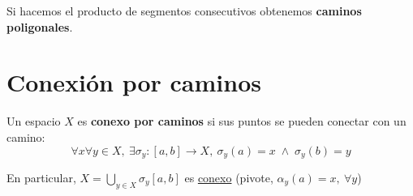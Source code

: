 \begin{ej}
Si hacemos el producto de segmentos consecutivos obtenemos \textbf{caminos poligonales}. 
\end{ej}

\section{Conexión por caminos}%
\label{sec:conexion_por_caminos}
\begin{defi}
Un espacio $X$ es \textbf{conexo por caminos} si sus puntos se pueden conectar con un camino:
\[
\forall x \forall y \in X,\ \exists \sigma_y: \left[ a, b \right] \rightarrow X,\ \sigma_y\left( a \right) = x\; \land \;\sigma_y\left( b \right) = y
\]
\end{defi}
\begin{obs}
En particular, $X = \bigcup_{y \in X} \sigma_y\left[ a, b \right]$ es \underline{conexo} (pivote, $\alpha_y\left( a \right) = x,\ \forall y$)
\end{obs}

